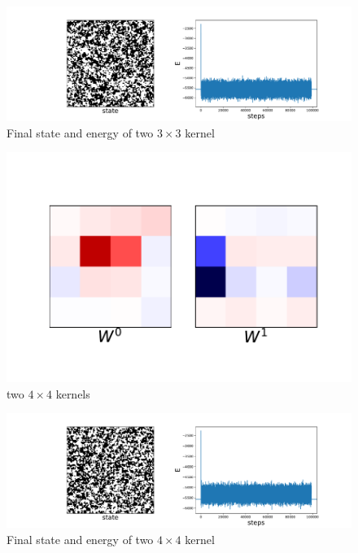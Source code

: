 \documentclass[12pt, two sided]{article}
\begin{document}
\begin{figure}[h!]
\includegraphics[width=\textwidth]{../figures/L_100_T_4.0_kernelDims_2-3_no_symmetries.pdf}
\caption{Final state and energy of two $3\times3$ kernel}
\end{figure}

\begin{figure}[h!]
\includegraphics[width=\textwidth]{../figures/T_4.0_kernelDims_2-4_no_symmetries.pdf}
\caption{two $4\times4$ kernels}
\end{figure}

\begin{figure}[h!]
\includegraphics[width=\textwidth]{../figures/L_100_T_4.0_kernelDims_2-4_no_symmetries.pdf}
\caption{Final state and energy of two $4\times4$ kernel}
\end{figure}
\end{document}
